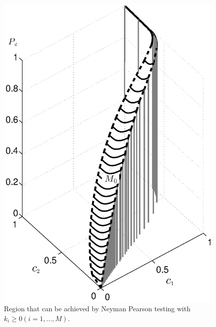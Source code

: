 \begin{figure}[!t]
\centering
\includegraphics[width=12cm, height=16cm]{3/singleROC.eps}
\caption{Region that can be achieved by Neyman Pearson testing with $k_i \geq 0 (i=1, ..., M)$.}
\label{pic: surface for m0 gaussian}
\end{figure}


